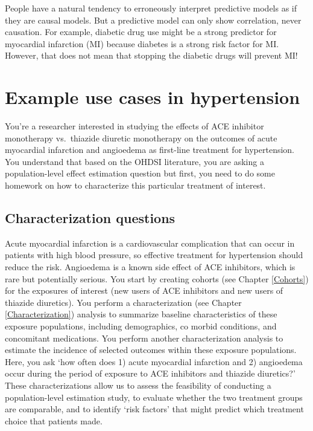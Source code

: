 \documentclass[11pt]{book}
\theoremstyle{definition}
\theoremstyle{definition}
\theoremstyle{definition}
\theoremstyle{remark}
\let\BeginKnitrBlock\begin \let\EndKnitrBlock\end
\begin{document}
\BeginKnitrBlock{rmdimportant}
People have a natural tendency to erroneously interpret predictive models as if they are causal models. But a predictive model can only show correlation, never causation. For example, diabetic drug use might be a strong predictor for myocardial infarction (MI) because diabetes is a strong risk factor for MI. However, that does not mean that stopping the diabetic drugs will prevent MI!
\EndKnitrBlock{rmdimportant}

\hypertarget{example-use-cases-in-hypertension}{%
\section{Example use cases in hypertension}\label{example-use-cases-in-hypertension}}

You're a researcher interested in studying the effects of ACE inhibitor monotherapy vs.~thiazide diuretic monotherapy on the outcomes of acute myocardial infarction and angioedema as first-line treatment for hypertension. You understand that based on the OHDSI literature, you are asking a population-level effect estimation question but first, you need to do some homework on how to characterize this particular treatment of interest.

\hypertarget{characterization-questions}{%
\subsection{Characterization questions}\label{characterization-questions}}

Acute myocardial infarction is a cardiovascular complication that can occur in patients with high blood pressure, so effective treatment for hypertension should reduce the risk. Angioedema is a known side effect of ACE inhibitors, which is rare but potentially serious. You start by creating cohorts (see Chapter \ref{Cohorts}) for the exposures of interest (new users of ACE inhibitors and new users of thiazide diuretics). You perform a characterization (see Chapter \ref{Characterization}) analysis to summarize baseline characteristics of these exposure populations, including demographics, co morbid conditions, and concomitant medications. You perform another characterization analysis to estimate the incidence of selected outcomes within these exposure populations. Here, you ask `how often does 1) acute myocardial infarction and 2) angioedema occur during the period of exposure to ACE inhibitors and thiazide diuretics?' These characterizations allow us to assess the feasibility of conducting a population-level estimation study, to evaluate whether the two treatment groups are comparable, and to identify `risk factors' that might predict which treatment choice that patients made.
\end{document}

